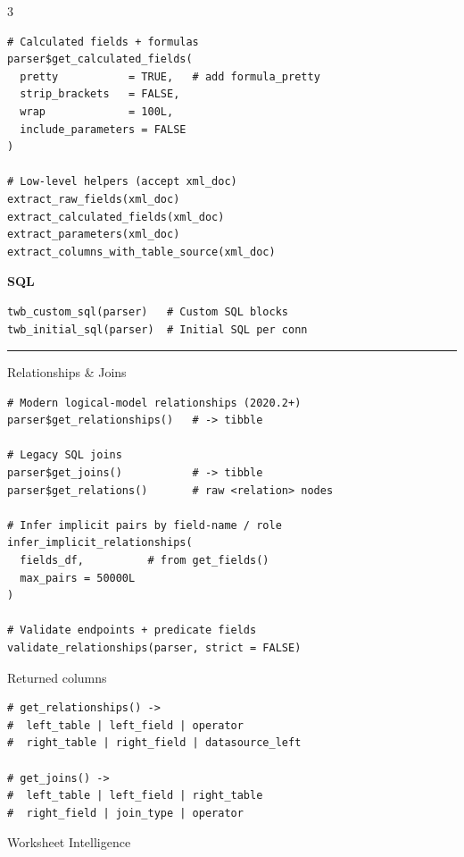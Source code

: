 \documentclass[10pt,landscape]{article}
\newcommand{\sep}{\vspace{1pt}\hrule\vspace{2pt}}
\begin{document}
\begin{multicols}{3}
\begin{lstlisting}
# Calculated fields + formulas
parser$get_calculated_fields(
  pretty           = TRUE,   # add formula_pretty
  strip_brackets   = FALSE,
  wrap             = 100L,
  include_parameters = FALSE
)

# Low-level helpers (accept xml_doc)
extract_raw_fields(xml_doc)
extract_calculated_fields(xml_doc)
extract_parameters(xml_doc)
extract_columns_with_table_source(xml_doc)
\end{lstlisting}

\textbf{SQL}

\begin{lstlisting}
twb_custom_sql(parser)   # Custom SQL blocks
twb_initial_sql(parser)  # Initial SQL per conn
\end{lstlisting}

\sep

\begin{secbox}[twbGreen]{Relationships \& Joins}
\end{secbox}

\begin{lstlisting}
# Modern logical-model relationships (2020.2+)
parser$get_relationships()   # -> tibble

# Legacy SQL joins
parser$get_joins()           # -> tibble
parser$get_relations()       # raw <relation> nodes

# Infer implicit pairs by field-name / role
infer_implicit_relationships(
  fields_df,          # from get_fields()
  max_pairs = 50000L
)

# Validate endpoints + predicate fields
validate_relationships(parser, strict = FALSE)
\end{lstlisting}

\begin{subbox}[twbGreenL]{Returned columns}
\begin{lstlisting}
# get_relationships() ->
#  left_table | left_field | operator
#  right_table | right_field | datasource_left

# get_joins() ->
#  left_table | left_field | right_table
#  right_field | join_type | operator
\end{lstlisting}
\end{subbox}

\columnbreak

\begin{secbox}[twbPurple]{Worksheet Intelligence}
\end{secbox}


\end{multicols}
\end{document}
